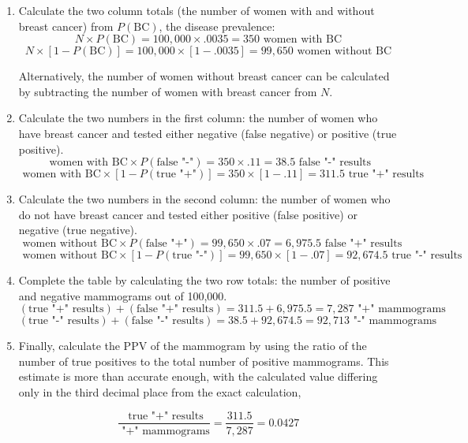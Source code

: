 \begin{enumerate}
	\item Calculate the two column totals (the number of women with and without breast cancer) from $P(\text{BC})$, the disease prevalence:
	\[N \times P(\text{BC}) = 100,000 \times .0035 = 350 \text{ women with BC}\]
	\[N \times [1 - P(\text{BC})] = 100,000 \times [1 - .0035] = 99,650 \text{ women without BC}\]
	
	Alternatively, the number of women without breast cancer can be calculated by subtracting the number of women with breast cancer from $N$.
	
	\item Calculate the two numbers in the first column: the number of women who have breast cancer and tested either negative (false negative) or positive (true positive).
	\[\text{ women with BC} \times P(\text{false "-"}) = 350 \times .11 = 38.5 \text{ false "-" results}\]
	\[\text{ women with BC} \times [1 - P(\text{true "+"})] = 350 \times [1 - .11] = 311.5 \text{ true "+" results}\]
	
	\item Calculate the two numbers in the second column: the number of women who do not have breast cancer and tested either positive (false positive) or negative (true negative). 
	\[\text{ women without BC} \times P(\text{false "+"}) = 99,650 \times .07 = 6,975.5 \text{ false "+" results}\]
	\[\text{ women without BC} \times [1 - P(\text{true "-"})] = 99,650 \times [1 - .07] = 92,674.5 \text{ true "-" results}\]
	
	\item Complete the table by calculating the two row totals: the number of positive and negative mammograms out of 100,000.
	\[(\text{true "+" results}) + (\text{false "+" results}) = 311.5 + 6,975.5 = 7,287 \text{ "+" mammograms}\]
	\[(\text{true "-" results}) + (\text{false "-" results}) = 38.5 + 92,674.5 = 92,713 \text{ "-" mammograms}\]
	
	\item Finally, calculate the PPV of the mammogram by using the ratio of the number of true positives to the total number of positive mammograms. This estimate is more than accurate enough, with the calculated value differing only in the third decimal place from the exact calculation, 
	
	\[\dfrac{\text{ true "+" results}}{\text{ "+" mammograms}} = \dfrac{311.5}{7,287} = 0.0427 \]
	
\end{enumerate}

